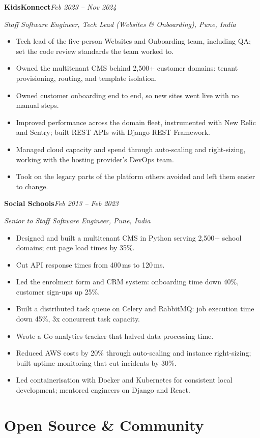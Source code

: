\documentclass[10pt,a4paper]{article}
\newcommand{\role}[4]{%
  \par\vspace{3pt}%
  \textbf{#1}\hfill\textit{#4}\par
  \textit{#2\if\relax\detokenize{#3}\relax\else, #3\fi}\par
  \vspace{1pt}%
}
\newenvironment{points}
  {\begin{itemize}[leftmargin=1.4em, itemsep=0.5pt, topsep=2pt, parsep=0pt]}
  {\end{itemize}}
\begin{document}
\role{KidsKonnect}{Staff Software Engineer, Tech Lead (Websites \& Onboarding)}%
  {Pune, India}{Feb 2023 -- Nov 2024}
\begin{points}
  \item Tech lead of the five-person Websites and Onboarding team, including QA; set the code review standards the team worked to.
  \item Owned the multitenant CMS behind 2,500+ customer domains: tenant provisioning, routing, and template isolation.
  \item Owned customer onboarding end to end, so new sites went live with no manual steps.
  \item Improved performance across the domain fleet, instrumented with New Relic and Sentry; built REST APIs with Django REST Framework.
  \item Managed cloud capacity and spend through auto-scaling and right-sizing, working with the hosting provider's DevOps team.
  \item Took on the legacy parts of the platform others avoided and left them easier to change.
\end{points}

\role{Social Schools}{Senior to Staff Software Engineer}{Pune, India}%
  {Feb 2013 -- Feb 2023}
\begin{points}
  \item Designed and built a multitenant CMS in Python serving 2,500+ school
        domains; cut page load times by 35\%.
  \item Cut API response times from 400\,ms to 120\,ms.
  \item Led the enrolment form and CRM system: onboarding time down 40\%,
        customer sign-ups up 25\%.
  \item Built a distributed task queue on Celery and RabbitMQ: job execution
        time down 45\%, 3x concurrent task capacity.
  \item Wrote a Go analytics tracker that halved data processing time.
  \item Reduced AWS costs by 20\% through auto-scaling and instance
        right-sizing; built uptime monitoring that cut incidents by 30\%.
  \item Led containerisation with Docker and Kubernetes for consistent local
        development; mentored engineers on Django and React.
\end{points}

\section*{Open Source \& Community}
\end{document}
